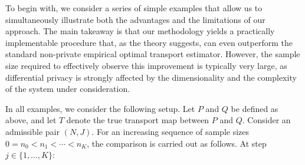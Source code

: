 \documentclass{article}
\newcommand{\1}{\mathds{1}}
\theoremstyle{plain}
\theoremstyle{definition}
\theoremstyle{remark}
\begin{document}
To begin with, we consider a series of simple examples that allow us to simultaneously illustrate both the advantages and the limitations of our approach. The main takeaway is that our methodology yields a practically implementable procedure that, as the theory suggests, can even outperform the standard non-private empirical optimal transport estimator. However, the sample size required to effectively observe this improvement is typically very large, as differential privacy is strongly affected by the dimensionality and the complexity of the system under consideration.

In all examples, we consider the following setup. 
Let $P$ and $Q$ be defined as above, and let $T$ denote the true transport map between $P$ and $Q$. Consider an admissible pair $(N,J)$.
For an increasing sequence of sample sizes 
$0 = n_0 < n_1 < \cdots < n_K$, 
the comparison is carried out as follows. 
At step $j \in \{1, \ldots, K\}$:
\end{document}
